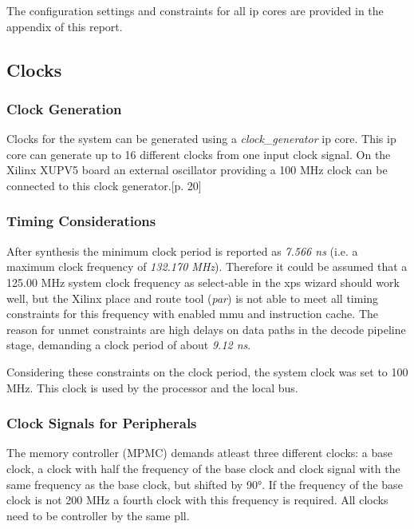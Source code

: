 The configuration settings and constraints for all \gls{ip} cores are provided in the appendix of this report.

\subsection{Clocks}
\label{sec:clocks}

\subsubsection{Clock Generation}

Clocks for the system can be generated using a \textit{clock\_generator} \gls{ip} core. This \gls{ip} core can generate up to 16 different clocks from one input clock signal. On the Xilinx XUPV5 board an external oscillator providing a 100 MHz clock can be connected to this clock generator.\cite{ug347}[p. 20]

\subsubsection{Timing Considerations}

After synthesis the minimum clock period is reported as \textit{7.566 ns} (i.e. a maximum clock frequency of \textit{132.170 MHz}). Therefore it could be assumed that a 125.00 MHz system clock frequency as select-able in the \gls{xps} wizard should work well, but the Xilinx place and route tool (\textit{par}) is not able to meet all timing constraints for this frequency with enabled \gls{mmu} and instruction cache. The reason for unmet constraints are high delays on data paths in the decode pipeline stage, demanding a clock period of about \textit{9.12 ns}.

Considering these constraints on the clock period, the system clock was set to 100 MHz. This clock is used by the processor and the local bus.

\subsubsection{Clock Signals for Peripherals}

The memory controller (MPMC) demands atleast three different clocks: a base clock, a clock with half the frequency of the base clock and clock signal with the same frequency as the base clock, but shifted by 90°. If the frequency of the base clock is not 200 MHz a fourth clock with this frequency is required. All clocks need to be controller by the same \gls{pll}.

